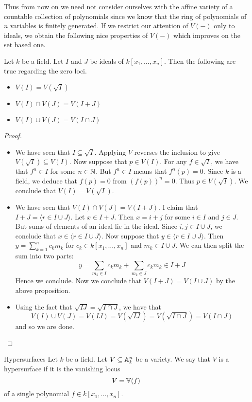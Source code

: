 \documentclass[a4paper]{article}
\begin{document}
Thus from now on we need not consider ourselves with the affine variety of a countable collection of polynomials since we know that the ring of polynomials of $n$ variables is finitely generated. If we restrict our attention of $V(-)$ only to ideals, we obtain the following nice properties of $V(-)$ which improves on the set based one. 

\begin{prp}{}{} Let $k$ be a field. Let $I$ and $J$ be ideals of $k[x_1,\dots,x_n]$. Then the following are true regarding the zero loci. 
\begin{itemize}
\item $V(I)=V(\sqrt{I})$
\item $V(I)\cap V(J)=V(I+J)$
\item $V(I)\cup V(J)=V(I\cap J)$
\end{itemize}\tcbline
\begin{proof}~\\
\begin{itemize}
\item We have seen that $I\subseteq\sqrt{I}$. Applying $V$ reverses the inclusion to give $V(\sqrt{I})\subseteq V(I)$. Now suppose that $p\in V(I)$. For any $f\in\sqrt{I}$, we have that $f^n\in I$ for some $n\in\mathbb{N}$. But $f^n\in I$ means that $f^n(p)=0$. Since $k$ is a field, we deduce that $f(p)=0$ from $(f(p))^n=0$. Thus $p\in V(\sqrt{I})$. We conclude that $V(I)=V(\sqrt{I})$. 
\item We have seen that $V(I)\cap V(J)=V(I+J)$. I claim that $I+J=\langle r\in I\cup J\rangle$. Let $x\in I+J$. Then $x=i+j$ for some $i\in I$ and $j\in J$. But sums of elements of an ideal lie in the ideal. Since $i,j\in I\cup J$, we conclude that $x\in\langle r\in I\cup J\rangle$. Now suppose that $y\in\langle r\in I\cup J\rangle$. Then $y=\sum_{k=1}^nc_km_k$ for $c_k\in k[x_1,\dots,x_n]$ and $m_k\in I\cup J$. We can then split the sum into two parts: $$y=\sum_{m_k\in I}c_km_k+\sum_{m_k\in J}c_km_k\in I+J$$ Hence we conclude. Now we conclude that $V(I+J)=V(I\cup J)$ by the above proposition. 
\item Using the fact that $\sqrt{IJ}=\sqrt{I\cap J}$, we have that $$V(I)\cup V(J)=V(IJ)=V(\sqrt{IJ})=V(\sqrt{I\cap J})=V(I\cap J)$$ and so we are done. 
\end{itemize}
\end{proof}
\end{prp}

\begin{defn}{Hypersurfaces}{} Let $k$ be a field. Let $V\subseteq\mathbb{A}_k^n$ be a variety. We say that $V$ is a hypersurface if it is the vanishing locus $$V=\mathbb{V}(f)$$ of a single polynomial $f\in k[x_1,\dots,x_n]$. 
\end{defn}
\end{document}
